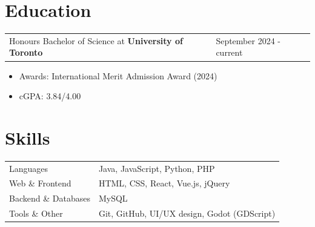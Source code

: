 \documentclass[a4paper,10pt]{article} %
\begin{document}
\section{Education}
\begin{tabularx}{\linewidth}{@{}l X@{}}
    Honours Bachelor of Science at \textbf{University of Toronto} & \hfill \normalsize September 2024 - current \\
\end{tabularx}
\begin{itemize}
    \item Awards: International Merit Admission Award (2024)
    \item cGPA: 3.84/4.00
\end{itemize}

\section{Skills}
\begin{tabularx}{\linewidth}{@{}l X@{}}
   Languages &  \normalsize{Java, JavaScript, Python, PHP}\\
   Web \& Frontend  &  \normalsize{HTML, CSS, React, Vue.js, jQuery}\\
   Backend \& Databases  &  \normalsize{MySQL}\\
   Tools \& Other  &  \normalsize{Git, GitHub, UI/UX design, Godot (GDScript)}\\
\end{tabularx}

\end{document}
